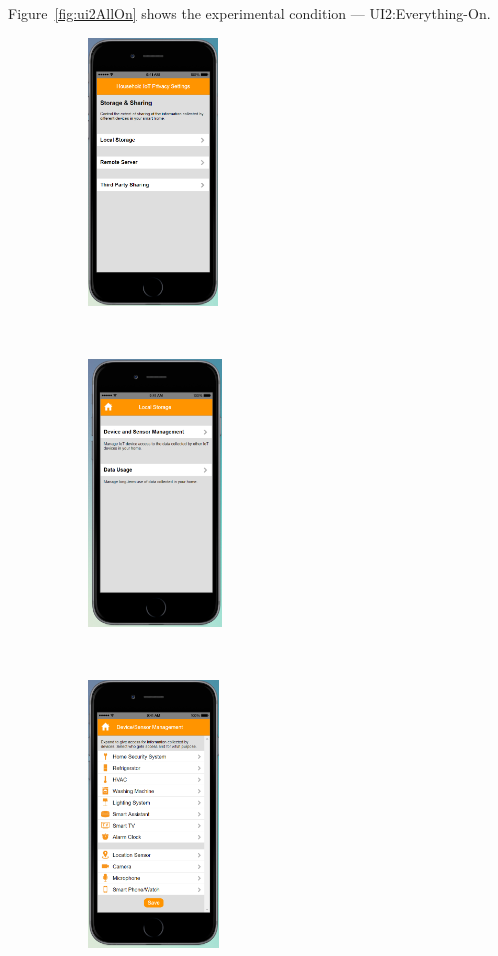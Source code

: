 Figure~\ref{fig:ui2AllOn} shows the experimental condition --- UI2:Everything-On.
\begin{figure}
	\centering
	\begin{subfigure}[t]{0.19\textwidth}
		\centering
		\includegraphics[height=2.8in]{figures/ui2allOff1.png}
	\end{subfigure}%
	~~~~~~
	\begin{subfigure}[t]{0.19\textwidth}
	\centering
	\includegraphics[height=2.8in]{figures/ui2allOffLocal.png}
	\end{subfigure}%
	~~~~~~
	\begin{subfigure}[t]{0.19\textwidth}
		\centering
		\includegraphics[height=2.8in]{figures/ui2allOff2.png}

\end{subfigure}
\end{figure}
